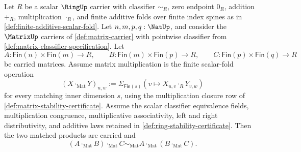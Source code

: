 \begin{theorem}
\label{thm:matrix-product-associativity-from-scalar-folds}
Let $R$ be a scalar $\RingUp$ carrier with classifier $\sim_R$, zero endpoint $0_R$, addition $+_R$, multiplication $\cdot_R$, and finite additive folds over finite index spines as in \autoref{def:finite-additive-scalar-fold}. Let $n,m,p,q:\NatUp$, and consider the $\MatrixUp$ carriers of \autoref{def:matrix-carrier} with pointwise classifier from \autoref{def:matrix-classifier-specification}. Let
$$
A:\mathsf{Fin}(n)\times\mathsf{Fin}(m)\to R,
\qquad
B:\mathsf{Fin}(m)\times\mathsf{Fin}(p)\to R,
\qquad
C:\mathsf{Fin}(p)\times\mathsf{Fin}(q)\to R
$$
be carried matrices. Assume matrix multiplication is the finite scalar-fold operation
$$
(X\cdot_{\mathrm{Mat}}Y)_{u,w}:=
\Sigma_{\mathsf{Fin}(s)}(v\mapsto X_{u,v}\cdot_RY_{v,w})
$$
for every matching inner dimension $s$, using the multiplication closure row of \autoref{def:matrix-stability-certificate}. Assume the scalar classifier equivalence fields, multiplication congruence, multiplicative associativity, left and right distributivity, and additive laws retained in \autoref{def:ring-stability-certificate}. Then the two matched products are carried and
$$
(A\cdot_{\mathrm{Mat}}B)\cdot_{\mathrm{Mat}}C
\sim_{\mathrm{Mat}}
A\cdot_{\mathrm{Mat}}(B\cdot_{\mathrm{Mat}}C).
$$
\end{theorem}
